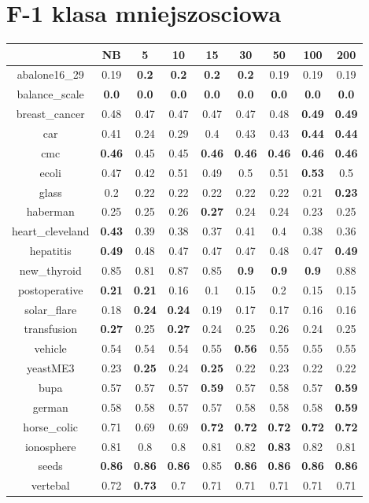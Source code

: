 \documentclass{article}%
\begin{document}
%
\section*{F{-}1 klasa mniejszosciowa}%
\begin{tabular}{c|cccccccc}%
\hline%
&NB&5&10&15&30&50&100&200\\%
\hline%
abalone16\_29&0.19&\textbf{0.2}&\textbf{0.2}&\textbf{0.2}&\textbf{0.2}&0.19&0.19&0.19\\%
\hline%
balance\_scale&\textbf{0.0}&\textbf{0.0}&\textbf{0.0}&\textbf{0.0}&\textbf{0.0}&\textbf{0.0}&\textbf{0.0}&\textbf{0.0}\\%
\hline%
breast\_cancer&0.48&0.47&0.47&0.47&0.47&0.48&\textbf{0.49}&\textbf{0.49}\\%
\hline%
car&0.41&0.24&0.29&0.4&0.43&0.43&\textbf{0.44}&\textbf{0.44}\\%
\hline%
cmc&\textbf{0.46}&0.45&0.45&\textbf{0.46}&\textbf{0.46}&\textbf{0.46}&\textbf{0.46}&\textbf{0.46}\\%
\hline%
ecoli&0.47&0.42&0.51&0.49&0.5&0.51&\textbf{0.53}&0.5\\%
\hline%
glass&0.2&0.22&0.22&0.22&0.22&0.22&0.21&\textbf{0.23}\\%
\hline%
haberman&0.25&0.25&0.26&\textbf{0.27}&0.24&0.24&0.23&0.25\\%
\hline%
heart\_cleveland&\textbf{0.43}&0.39&0.38&0.37&0.41&0.4&0.38&0.36\\%
\hline%
hepatitis&\textbf{0.49}&0.48&0.47&0.47&0.47&0.48&0.47&\textbf{0.49}\\%
\hline%
new\_thyroid&0.85&0.81&0.87&0.85&\textbf{0.9}&\textbf{0.9}&\textbf{0.9}&0.88\\%
\hline%
postoperative&\textbf{0.21}&\textbf{0.21}&0.16&0.1&0.15&0.2&0.15&0.15\\%
\hline%
solar\_flare&0.18&\textbf{0.24}&\textbf{0.24}&0.19&0.17&0.17&0.16&0.16\\%
\hline%
transfusion&\textbf{0.27}&0.25&\textbf{0.27}&0.24&0.25&0.26&0.24&0.25\\%
\hline%
vehicle&0.54&0.54&0.54&0.55&\textbf{0.56}&0.55&0.55&0.55\\%
\hline%
yeastME3&0.23&\textbf{0.25}&0.24&\textbf{0.25}&0.22&0.23&0.22&0.22\\%
\hline%
bupa&0.57&0.57&0.57&\textbf{0.59}&0.57&0.58&0.57&\textbf{0.59}\\%
\hline%
german&0.58&0.58&0.57&0.57&0.58&0.58&0.58&\textbf{0.59}\\%
\hline%
horse\_colic&0.71&0.69&0.69&\textbf{0.72}&\textbf{0.72}&\textbf{0.72}&\textbf{0.72}&\textbf{0.72}\\%
\hline%
ionosphere&0.81&0.8&0.8&0.81&0.82&\textbf{0.83}&0.82&0.81\\%
\hline%
seeds&\textbf{0.86}&\textbf{0.86}&\textbf{0.86}&0.85&\textbf{0.86}&\textbf{0.86}&\textbf{0.86}&\textbf{0.86}\\%
\hline%
vertebal&0.72&\textbf{0.73}&0.7&0.71&0.71&0.71&0.71&0.71\\%
\hline%
\end{tabular}
\end{document}
